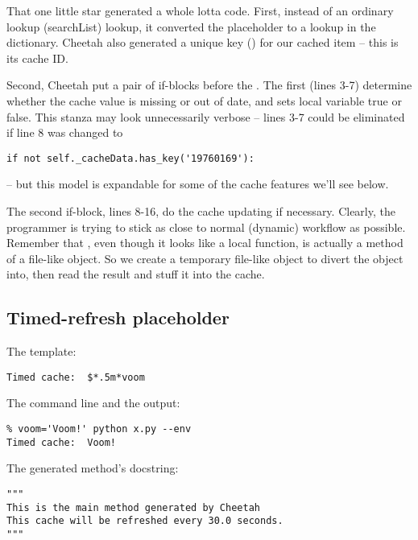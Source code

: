 That one little star generated a whole lotta code.  First, instead of an 
ordinary  lookup (searchList) lookup, it converted the
placeholder to a lookup in the  dictionary.  Cheetah also
generated a unique key () for our cached item -- this is its
cache ID.

Second, Cheetah put a pair of if-blocks before the .  The first
(lines 3-7) determine whether the cache value is missing or out of date, and
sets local variable  true or false.
This stanza may look unnecessarily verbose -- lines 3-7 could be eliminated if
line 8 was changed to
\begin{verbatim}
if not self._cacheData.has_key('19760169'):
\end{verbatim}
-- but this model is expandable for some of the cache features we'll see below.

The second if-block, lines 8-16, do the cache updating if necessary.
Clearly, the programmer is trying to stick as close to normal (dynamic)
workflow as possible.  Remember that , even though it looks like a
local function, is actually a method of a file-like object.  So we create a
temporary file-like object to divert the  object into, then read
the result and stuff it into the cache.

\subsection{Timed-refresh placeholder}
\label{cache.timed}

The template:
\begin{verbatim}
Timed cache:  $*.5m*voom
\end{verbatim}

The command line and the output:
\begin{verbatim}
% voom='Voom!' python x.py --env
Timed cache:  Voom!
\end{verbatim}

The generated method's docstring:
\begin{verbatim}
"""
This is the main method generated by Cheetah
This cache will be refreshed every 30.0 seconds.
"""
\end{verbatim}

